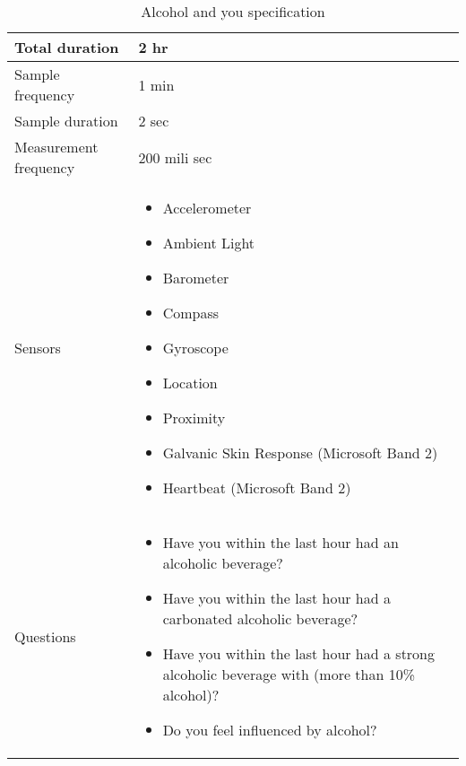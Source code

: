 \begin{table}[!htbp]
    \centering
	\begin{tabular}{|m{}|m{}|} \hline
	Total duration        & 2 hr                                                                                                                                                                                                                                                           \\ \hline
	Sample frequency      & 1 min                                                                                                                                                                                                                                                          \\ \hline
	Sample duration       & 2 sec                                                                                                                                                                                                                                                          \\ \hline
	Measurement frequency & 200 mili sec                                                                                                                                                                                                                                                   \\ \hline
	Sensors               & \begin{itemize}[noitemsep]
								\item Accelerometer 
								\item Ambient Light
								\item Barometer
								\item Compass
								\item Gyroscope
								\item Location
								\item Proximity
								\item Galvanic Skin Response (Microsoft Band 2)
								\item Heartbeat (Microsoft Band 2)
							\end{itemize} \\\hline
	Questions             & \begin{itemize}[noitemsep]
								\item Have you within the last hour had an alcoholic beverage?
								\item Have you within the last hour had a carbonated alcoholic beverage?
								\item Have you within the last hour had a strong alcoholic beverage with (more than 10\% alcohol)?
								\item Do you feel influenced by alcohol?
							\end{itemize} \\ \hline
	\end{tabular}
	\caption{Alcohol and you specification}
	\label{tab:test_campaign_spec}
\end{table}
\FloatBarrier

